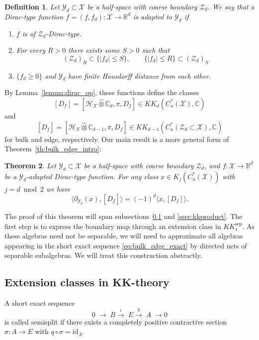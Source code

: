 \documentclass[12pt]{amsart}
\newtheorem{theorem}{Theorem}[section]
\newtheorem{definition}[theorem]{Definition}
\newcommand{\CM}{{\mathbb C}}
\newcommand{\RM}{{\mathbb R}}
\newcommand{\Hh}{{\mathcal H}}
\newcommand{\Xx}{{\mathcal X}}
\newcommand{\Yy}{{\mathcal Y}}
\newcommand{\Zz}{{\mathcal Z}}
\newcommand{\pdv}{\partial}
\begin{document}
\begin{definition}\label{def:dirac_type_adapted}
Let $\Yy_d\subset \Xx$ be a half-space with coarse boundary $\Zz_d$. We say that a Dirac-type function $f = (\underline{f},f_d):\Xx\to \RM^d$ is adapted to $\Yy_d$ if
\begin{enumerate}
    \item[(i)] $\underline{f}$ is of $\Zz_d$-Dirac-type.
    \item[(ii)] For every $R>0$ there exists some $S>0$ such that
    $$(\Zz_d)_R\subset \{|f_d|\leq S\}, \qquad \{|f_d|\leq R\}\subset (\Zz_d)_S $$

    \item[(iii)] $\{f_d \geq 0\}$ and $\Yy_d$ have finite Hausdorff distance from each other.
\end{enumerate}
\end{definition}
By Lemma~\ref{lemma:dirac_op}, these functions define the classes $$[D_f]=[\Hh_\Xx \hat{\otimes} \CM_d, \pi, D_{f}]\in KK_{d}(C^*_u(\Xx), \CM)$$ and $$[D_{\underline{f}}]=[\Hh_\Xx \hat{\otimes} \CM_{d-1}, \pi, D_{\underline{f}}]\in KK_{d-1}(C^*_u(\Zz_d\subset \Xx),\CM)$$ for bulk and edge, respectively. Our main result is a more general form of Theorem~\ref{th:bulk_edge_intro}:
\begin{theorem}
\label{th:bulk_edge}
Let $\Yy_d\subset \Xx$ be a half-space with coarse boundary $\Zz_d$, and $f:\Xx\to \RM^d$ be a $\Yy_d$-adapted Dirac-type function.
For any class $x\in K_j(C^*_u(\Xx))$ with $j=d\bmod 2$ we have
\[\langle \pdv_{\Yy_d}(x), [D_{\underline{f}}]\rangle = (-1)^{d}\langle x, [D_{f}]\rangle.\]
\end{theorem}
The proof of this theorem will span subsections~\ref{ssec:extensionclass} and \ref{ssec:kkproduct}. The first step is to express the boundary map through an extension class in $KK_1^{\mathrm{sep}}$. As these algebras need not be separable, we will need to approximate all algebras appearing in the short exact sequence \eqref{eq:bulk_edge_exact} by directed nets of separable subalgebras. We will treat this construction abstractly.

\subsection{Extension classes in KK-theory}
\label{ssec:extensionclass}
A short exact sequence
$$0\;\rightarrow\;B\xrightarrow{\iota}\;E\xrightarrow{q}\;A\;\rightarrow0$$
is called semisplit if there exists a completely positive contractive section $\sigma:A\to E$ with $q\circ \sigma=\mathrm{id}_A$.
\end{document}
